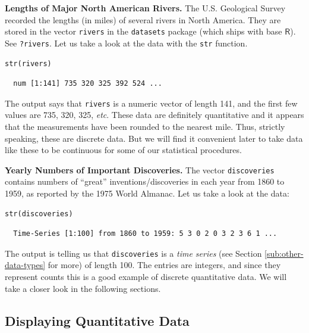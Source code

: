 \documentclass[captions=tableheading]{scrbook}
\begin{document}
\begin{example}
\textbf{Lengths of Major North American Rivers.} The U.S. Geological Survey recorded the lengths (in miles) of several rivers in North America. They are stored in the vector \texttt{rivers} in the \texttt{datasets} package (which ships with base \(\mathsf{R}\)). See \texttt{?rivers}. Let us take a look at the data with the \texttt{str} function.


\begin{verbatim}
str(rivers)
\end{verbatim}

\begin{verbatim}
  num [1:141] 735 320 325 392 524 ...
\end{verbatim}

The output says that \texttt{rivers} is a numeric vector of length 141, and the first few values are 735, 320, 325, \emph{etc}. These data are definitely quantitative and it appears that the measurements have been rounded to the nearest mile. Thus, strictly speaking, these are discrete data. But we will find it convenient later to take data like these to be continuous for some of our statistical procedures. 
\end{example}

\begin{example}
\textbf{Yearly Numbers of Important Discoveries.} The vector \texttt{discoveries} contains numbers of “great” inventions/discoveries in each year from 1860 to 1959, as reported by the 1975 World Almanac. Let us take a look at the data:


\begin{verbatim}
str(discoveries)
\end{verbatim}

\begin{verbatim}
  Time-Series [1:100] from 1860 to 1959: 5 3 0 2 0 3 2 3 6 1 ...
\end{verbatim}

\end{example}

The output is telling us that \texttt{discoveries} is a \emph{time series} (see Section \ref{sub:other-data-types} for more) of length 100. The entries are integers, and since they represent counts this is a good example of discrete quantitative data. We will take a closer look in the following sections.
\subsection{Displaying Quantitative Data}
\label{sec-2-1-2}
\label{sub:Displaying-Quantitative-Data}
\end{document}
